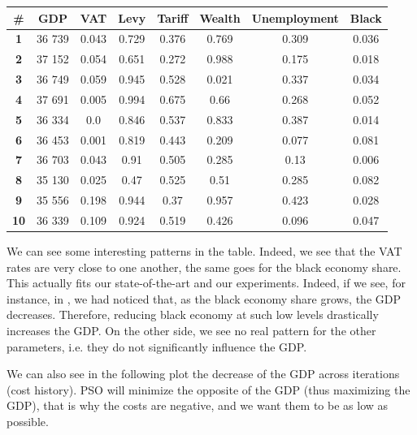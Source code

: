             \begin{table}[H]
            \centering
            \begin{tabular}{|c|c|c|c|c|c|c|c|}
                \hline
                \textbf{\#} & \textbf{GDP}  & \textbf{VAT} & \textbf{Levy} & \textbf{Tariff} & \textbf{Wealth} & \textbf{Unemployment} & \textbf{Black} \\ \hline
                \textbf{1} & 36 739 & 0.043 & 0.729 & 0.376 & 0.769 & 0.309 & 0.036 \\ \hline
                \textbf{2} & 37 152 & 0.054 & 0.651 & 0.272 & 0.988 & 0.175 & 0.018 \\ \hline
                \textbf{3} & 36 749 & 0.059 & 0.945 & 0.528 & 0.021 & 0.337 & 0.034 \\ \hline
                \textbf{4} & 37 691 & 0.005 & 0.994 & 0.675 & 0.66 & 0.268 & 0.052 \\ \hline
                \textbf{5} & 36 334 & 0.0 & 0.846 & 0.537 & 0.833 & 0.387 & 0.014 \\ \hline
                \textbf{6} & 36 453 & 0.001 & 0.819 & 0.443 & 0.209 & 0.077 & 0.081 \\ \hline
                \textbf{7} & 36 703 & 0.043 & 0.91 & 0.505 & 0.285 & 0.13 & 0.006 \\ \hline
                \textbf{8} & 35 130 & 0.025 & 0.47 & 0.525 & 0.51 & 0.285 & 0.082 \\ \hline
                \textbf{9} & 35 556 & 0.198 & 0.944 & 0.37 & 0.957 & 0.423 & 0.028 \\ \hline
                \textbf{10} & 36 339 & 0.109 & 0.924 & 0.519 & 0.426 & 0.096 & 0.047 \\ \hline
            \end{tabular}
            \end{table}

            We can see some interesting patterns in the table. Indeed, we see that the VAT rates are very close to one another, the same goes for the black economy share. This actually fits our state-of-the-art and our experiments. Indeed, if we see, for instance, in , we had noticed that, as the black economy share grows, the GDP decreases. Therefore, reducing black economy at such low levels drastically increases the GDP.
            On the other side, we see no real pattern for the other parameters, i.e. they do not significantly influence the GDP.

            We can also see in the following plot the decrease of the GDP across iterations (cost history). PSO will minimize the opposite of the GDP (thus maximizing the GDP), that is why the costs are negative, and we want them to be as low as possible.

